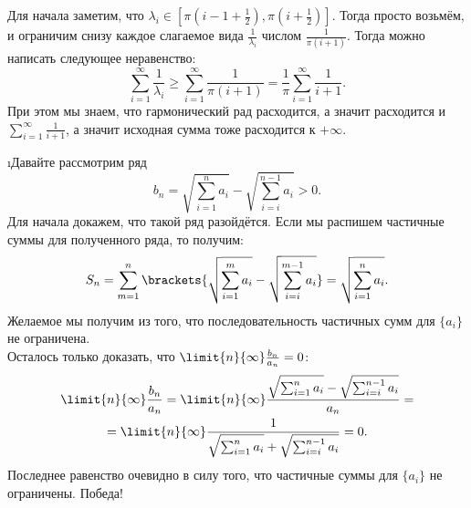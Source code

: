 \par\pu Для начала заметим, что $\lambda_i \in \left[\pi(i-1+\frac{1}{2}), \pi(i+\frac{1}{2})\right]$. Тогда просто возьмём, и ограничим снизу каждое слагаемое вида 
$\frac{1}{\lambda_i}$ числом $\frac{1}{\pi(i+1)}$. Тогда можно написать следующее неравенство:
    \[\sum_{i=1}^{\infty} \frac{1}{\lambda_i} \geq \sum_{i=1}^{\infty} \frac{1}{\pi(i+1)} = \frac{1}{\pi} \sum_{i=1}^{\infty} \frac{1}{i+1}.\]
При этом мы знаем, что гармонический рад расходится, а значит расходится и $\sum_{i=1}^{\infty} \frac{1}{i+1}$, а значит исходная сумма тоже расходится к $+\infty$.


\i Давайте рассмотрим ряд 
    \[b_n = \sqrt{\sum_{i=1}^n a_i} - \sqrt{\sum_{i=i}^{n-1} a_i} > 0.\]
Для начала докажем, что такой ряд разойдётся. Если мы распишем частичные суммы для полученного ряда, то получим:
    \[S_n = \sum_{m=1}^n \brackets{\sqrt{\sum_{i=1}^m a_i} - \sqrt{\sum_{i=i}^{m-1} a_i}} = \sqrt{\sum_{i=1}^n a_i}.\]
Желаемое мы получим из того, что последовательность частичных сумм для $\{a_i\}$ не ограничена.\\ 
Осталось только доказать, что $\limit{n}{\infty} \frac{b_n}{a_n} = 0$:
\begin{gather*}
    \limit{n}{\infty} \frac{b_n}{a_n} = \limit{n}{\infty} \frac{\sqrt{\sum_{i=1}^{n\phantom{1}} a_i} - \sqrt{\sum_{i=i}^{n-1} a_i}}{a_n} = \\ = 
    \limit{n}{\infty} \frac{1}{\sqrt{\sum_{i=1}^{n\phantom{1}} a_i} + \sqrt{\sum_{i=i}^{n-1} a_i}} = 0.
\end{gather*}
Последнее равенство очевидно в силу того, что частичные суммы для $\{a_i\}$ не ограничены. Победа!